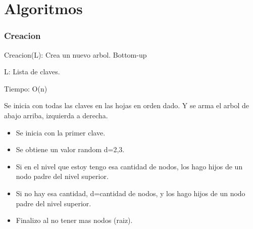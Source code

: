 \documentclass[10pt,handout]{beamer}
\begin{document}

\section{Algoritmos}
\begin{frame}
\frametitle{Creacion}

  Creacion(L): Crea un nuevo arbol. Bottom-up

  L: Lista de claves.

  Tiempo: O(n)

  Se inicia con todas las claves en las hojas en orden dado.
  Y se arma el arbol de abajo arriba, izquierda a derecha.

\begin{itemize}
  \item Se inicia con la primer clave.
  \item Se obtiene un valor random d={2,3}.
  \item Si en el nivel que estoy tengo esa cantidad de nodos, los hago hijos de
    un nodo padre del nivel superior.
  \item Si no hay esa cantidad, d=cantidad de nodos, y los hago hijos de un nodo
    padre del nivel superior.
  \item Finalizo al no tener mas nodos (raiz).
\end{itemize}

\end{frame}

\end{document}

